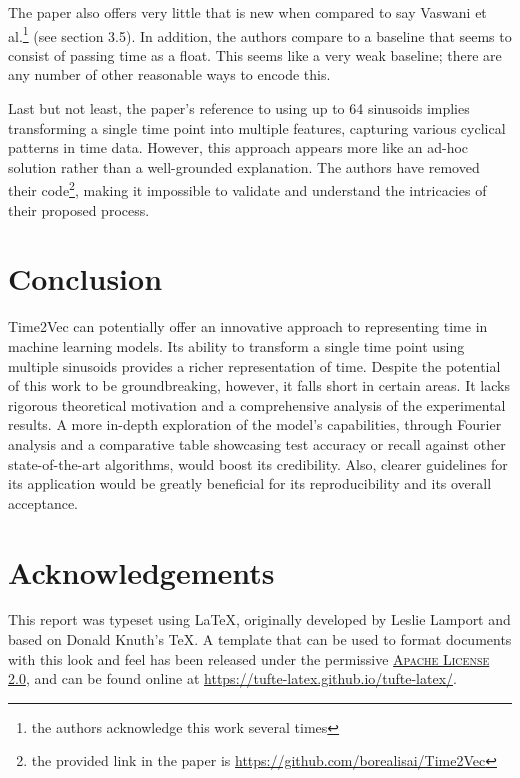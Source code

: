 \documentclass{tufte-handout}
\begin{document}
The paper also offers very little that is new when compared to say Vaswani et al.\cite{attention}\footnote{the authors acknowledge this work several times} (see section 3.5). In addition, the authors compare to a baseline that seems to consist of passing time as a float. This seems like a very weak baseline; there are any number of other reasonable ways to encode this.

Last but not least, the paper's reference to using up to 64 sinusoids implies transforming a single time point into multiple features, capturing various cyclical patterns in time data. However, this approach appears more like an ad-hoc solution rather than a well-grounded explanation. The authors have removed their code\footnote{the provided link in the paper is \url{https://github.com/borealisai/Time2Vec}}, making it impossible to validate and understand the intricacies of their proposed process.

\section{Conclusion}

Time2Vec can potentially offer an innovative approach to representing time in machine learning models. Its ability to transform a single time point using multiple sinusoids provides a richer representation of time. Despite the potential of this work to be groundbreaking, however, it falls short in certain areas. It lacks rigorous theoretical motivation and a comprehensive analysis of the experimental results. A more in-depth exploration of the model's capabilities, through Fourier analysis and a comparative table showcasing test accuracy or recall against other state-of-the-art algorithms, would boost its credibility. Also, clearer guidelines for its application would be greatly beneficial for its reproducibility and its overall acceptance.

\section{Acknowledgements}\label{sec:support}

This report was typeset using \LaTeX, originally developed by Leslie Lamport and based on Donald Knuth's \TeX. A template that can be used to format documents with this look and feel has been released under the permissive \href{http://www.apache.org/licenses/LICENSE-2.0}{\textsc{Apache License 2.0}}, and can be found online at \url{https://tufte-latex.github.io/tufte-latex/}.



\end{document}
